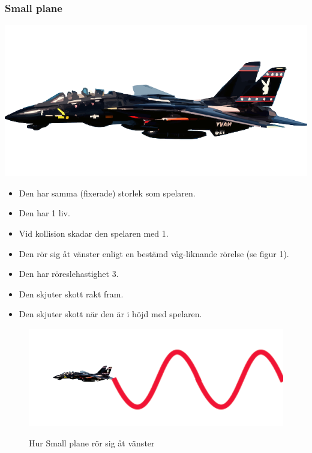 \documentclass{TDP005mall}
\begin{document}
\subsubsection*{Small plane}
\includegraphics[scale=0.15]{Images/Enemy1.png}
\begin{itemize}
\item Den har samma (fixerade) storlek som spelaren.
\item Den har 1 liv.
\item Vid kollision skadar den spelaren med 1.
\item Den rör sig åt vänster enligt en bestämd våg-liknande rörelse (se figur 1).
\item Den har röreslehastighet 3. 
\item Den skjuter skott rakt fram.
\item Den skjuter skott när den är i höjd med spelaren.
\end{itemize}
\begin{figure}[h!]
  \centering
  \includegraphics[scale=0.4]{Images/Enemy1-movement.png}
  \label{Bild 1}
  \caption{Hur Small plane rör sig åt vänster}
\end{figure}
\end{document}
